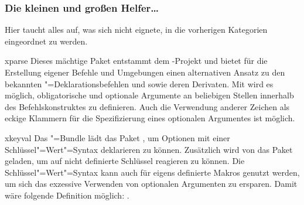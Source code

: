 \subsubsection{Die kleinen und großen Helfer\dots}
Hier taucht alles auf, was sich nicht eignete, in die vorherigen Kategorien 
eingeordnet zu werden.
%
\begin{packages}
\item[xparse]
  Dieses mächtige Paket entstammt dem -Projekt und bietet für 
  die Erstellung eigener Befehle und Umgebungen einen alternativen Ansatz zu 
  den bekannten "=Deklarationsbefehlen  und 
   sowie deren Derivaten. Mit  wird es 
  möglich, obligatorische und optionale Argumente an beliebigen Stellen 
  innerhalb des Befehlskonstruktes zu definieren. Auch die Verwendung anderer 
  Zeichen als eckige Klammern für die Spezifizierung eines optionalen 
  Argumentes ist möglich.
\item[xkeyval]
  Das \KOMAScript{}"=Bundle lädt das Paket , um Optionen mit 
  einer Schlüssel"=Wert"=Syntax deklarieren zu können. Zusätzlich wird von 
  \TUDScript das Paket  geladen, um auf nicht definierte 
  Schlüssel reagieren zu können. Die Schlüssel"=Wert"=Syntax kann auch für 
  eigens definierte Makros genutzt werden, um sich das exzessive Verwenden von 
  optionalen Argumenten zu ersparen. Damit wäre folgende Definition möglich:
  .
  

\end{packages}
